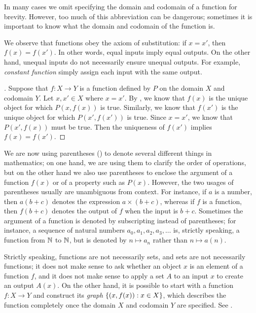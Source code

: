 \begin{note}
  In many cases we omit specifying the domain and codomain of a function for brevity.
  However, too much of this abbreviation can be dangerous;
  sometimes it is important to know what the domain and codomain of the function is.
\end{note}

\begin{ac}\label{i:ac:3.3.1}
  We observe that functions obey the axiom of substitution:
  if \(x = x'\), then \(f(x) = f(x')\).
  In other words, equal inputs imply equal outputs.
  On the other hand, unequal inputs do not necessarily ensure unequal outputs.
  For example, \emph{constant function} simply assign each input with the same output.
\end{ac}

\begin{proof}[]
  Suppose that \(f : X \to Y\) is a function defined by \(P\) on the domain \(X\) and codomain \(Y\).
  Let \(x, x' \in X\) where \(x = x'\).
  By , we know that \(f(x)\) is the unique object for which \(P(x, f(x))\) is true.
  Similarly, we know that \(f(x')\) is the unique object for which \(P(x', f(x'))\) is true.
  Since \(x = x'\), we know that \(P(x', f(x))\) must be true.
  Then the uniqueness of \(f(x')\) implies \(f(x) = f(x')\).
\end{proof}

\setcounter{thm}{4}
\begin{rmk}\label{i:3.3.5}
  We are now using parentheses () to denote several different things in mathematics;
  on one hand, we are using them to clarify the order of operations, but on the other hand we also use parentheses to enclose the argument of a function \(f(x)\) or of a property such as \(P(x)\).
  However, the two usages of parentheses usually are unambiguous from context.
  For instance, if \(a\) is a number, then \(a(b + c)\) denotes the expression \(a \times (b + c)\), whereas if \(f\) is a function, then \(f(b + c)\) denotes the output of \(f\) when the input is \(b + c\).
  Sometimes the argument of a function is denoted by subscripting instead of parentheses;
  for instance, a sequence of natural numbers \(a_0, a_1, a_2, a_3, \dots\) is, strictly speaking, a function from \(\mathbb{N}\) to \(\mathbb{N}\), but is denoted by \(n \mapsto a_n\) rather than \(n \mapsto a(n)\).
\end{rmk}

\begin{rmk}\label{i:3.3.6}
  Strictly speaking, functions are not necessarily sets, and sets are not necessarily functions;
  it does not make sense to ask whether an object \(x\) is an element of a function \(f\), and it does not make sense to apply a set \(A\) to an input \(x\) to create an output \(A(x)\).
  On the other hand, it is possible to start with a function \(f : X \to Y\) and construct its \emph{graph} \(\left\lbrace(x, f(x)) : x \in X\right\rbrace\), which describes the function completely once the domain \(X\) and codomain \(Y\) are specified.
  See .
\end{rmk}

